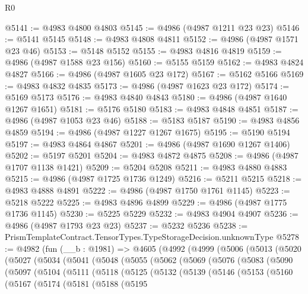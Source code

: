 \begin{lexlean}{R0}
\begin{coremodule}
@5141 := @4983 @4800 @4803
@5145 := @4986 (@4987 @1211 @23 @23)
@5146 := @5141 @5145
@5148 := @4983 @4808 @4811
@5152 := @4986 (@4987 @1571 @23 @46)
@5153 := @5148 @5152
@5155 := @4983 @4816 @4819
@5159 := @4986 (@4987 @1588 @23 @156)
@5160 := @5155 @5159
@5162 := @4983 @4824 @4827
@5166 := @4986 (@4987 @1605 @23 @172)
@5167 := @5162 @5166
@5169 := @4983 @4832 @4835
@5173 := @4986 (@4987 @1623 @23 @172)
@5174 := @5169 @5173
@5176 := @4983 @4840 @4843
@5180 := @4986 (@4987 @1640 @1267 @1651)
@5181 := @5176 @5180
@5183 := @4983 @4848 @4851
@5187 := @4986 (@4987 @1053 @23 @46)
@5188 := @5183 @5187
@5190 := @4983 @4856 @4859
@5194 := @4986 (@4987 @1227 @1267 @1675)
@5195 := @5190 @5194
@5197 := @4983 @4864 @4867
@5201 := @4986 (@4987 @1690 @1267 @1406)
@5202 := @5197 @5201
@5204 := @4983 @4872 @4875
@5208 := @4986 (@4987 @1707 @1138 @1421)
@5209 := @5204 @5208
@5211 := @4983 @4880 @4883
@5215 := @4986 (@4987 @1725 @1736 @1249)
@5216 := @5211 @5215
@5218 := @4983 @4888 @4891
@5222 := @4986 (@4987 @1750 @1761 @1145)
@5223 := @5218 @5222
@5225 := @4983 @4896 @4899
@5229 := @4986 (@4987 @1775 @1736 @1145)
@5230 := @5225 @5229
@5232 := @4983 @4904 @4907
@5236 := @4986 (@4987 @1793 @23 @23)
@5237 := @5232 @5236
@5238 := PrismTemplateContract.TensorTypes.TypeStorageDecision.unknownType
@5278 := @4982
    (fun (__b : @1981) =>
    @4605
      (@4992
        (@4999
          (@5006
            (@5013
              (@5020
                (@5027
                  (@5034
                    (@5041
                      (@5048
                        (@5055
                          (@5062
                            (@5069
                              (@5076
                                (@5083
                                  (@5090
                                    (@5097
                                      (@5104
                                        (@5111
                                          (@5118
                                            (@5125
                                              (@5132
                                                (@5139
                                                  (@5146
                                                    (@5153
                                                      (@5160
                                                        (@5167
                                                          (@5174
                                                            (@5181
                                                              (@5188
                                                                (@5195

\end{coremodule}
\end{lexlean}
